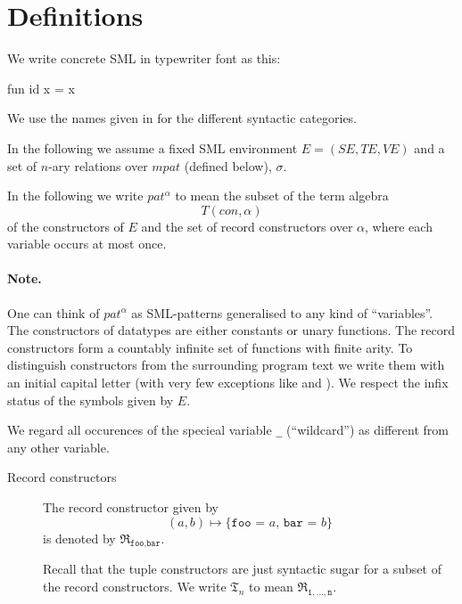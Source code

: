 \section{Definitions}
We write concrete SML in typewriter font as this:
\begin{sml}
fun id x = x
\end{sml}

We use the names given in \cite{SML97} for the different syntactic categories.

In the following we assume a fixed SML environment $E = (S\!E, T\!E, V\!E)$ and
a set of $n$-ary relations over $mpat$ (defined below), $\sigma$.

\begin{definition}
  In the following we write $pat^\alpha$ to mean the subset of the term algebra
  \[
  T(con, \alpha)
  \]
  of the constructors of $E$ and the set of record constructors over $\alpha$,
  where each variable occurs at most once. 

\end{definition}

\paragraph{Note.} One can think of $pat^\alpha$ as SML-patterns generalised to
any kind of ``variables''. The constructors of datatypes are either constants or
unary functions. The record constructors form a countably infinite set of
functions with finite arity. To distinguish constructors from the surrounding
program text we write them with an initial capital letter (with very few
exceptions like \codeinline{::} and ). We respect the infix
status of the symbols given by $E$.

We regard all occurences of the specieal variable \texttt{\_} (``wildcard'') as
different from any other variable.

\begin{description}
\item[Record constructors] The record constructor given by
  \[
  (a, b) \mapsto \texttt{\{foo = $a$, bar = $b$\}}
  \]
  is denoted by $\mathfrak{R}_{\texttt{foo},\texttt{bar}}$.

  Recall that the tuple constructors are just syntactic sugar for a subset of
  the record constructors. We write $\mathfrak{T}_n$ to mean
  $\mathfrak{R}_{\texttt{1},\ldots,\texttt{n}}$.
\end{description}

